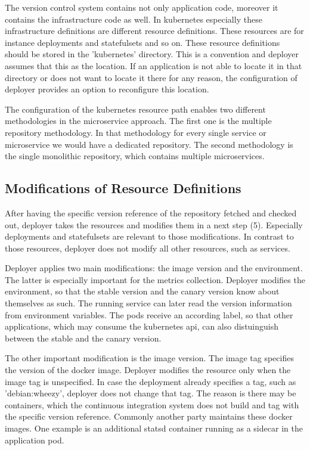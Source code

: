 The version control system contains not only application code, moreover it contains the
infrastructure code as well. In kubernetes especially these infrastructure definitions are
different resource definitions. These resources are for instance deployments and
statefulsets and so on. These resource definitions should be stored in the 'kubernetes'
directory. This is a convention and deployer assumes that this as the location. If an
application is not able to locate it in that directory or does not want to locate it there
for any reason, the configuration of deployer provides an option to reconfigure this
location.

The configuration of the kubernetes resource path enables two different methodologies in
the microservice approach. The first one is the multiple repository methodology. In that
methodology for every single service or microservice we would have a dedicated repository.
The second methodology is the single monolithic repository, which contains multiple
microservices.

\subsection{Modifications of Resource Definitions}

After having the specific version reference of the repository fetched and checked out,
deployer takes the resources and modifies them in a next step (5). Especially deployments
and statefulsets are relevant to those modifications. In contrast to those resources,
deployer does not modify all other resources, such as services.

Deployer applies two main modifications: the image version and the environment. The latter
is especially important for the metrics collection. Deployer modifies the environment, so
that the stable version and the canary version know about themselves as such. The running
service can later read the version information from environment variables. The pods
receive an according label, so that other applications, which may consume the kubernetes
api, can also distuinguish between the stable and the canary version.

The other important modification is the image version. The image tag specifies the version
of the docker image. Deployer modifies the resource only when the image tag is
unspecified. In case the deployment already specifies a tag, such as 'debian:wheezy',
deployer does not change that tag. The reason is there may be containers, which the
continuous integration system does not build and tag with the specific version
reference. Commonly another party maintains these docker images. One example is an
additional statsd container running as a sidecar in the application pod.

